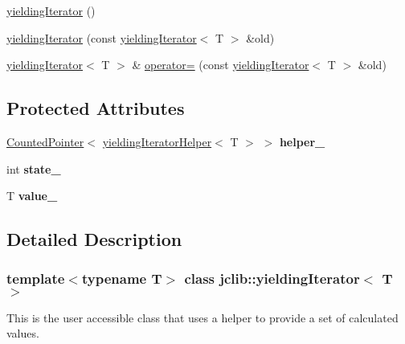 \begin{DoxyCompactItemize}
\item 
\hyperlink{classjclib_1_1yieldingIterator_a2dc7307fa736746412ad507c2acbd963}{yielding\+Iterator} ()
\item 
\hyperlink{classjclib_1_1yieldingIterator_a8aaf76517fb120bca9cae336eff64458}{yielding\+Iterator} (const \hyperlink{classjclib_1_1yieldingIterator}{yielding\+Iterator}$<$ T $>$ \&old)
\item 
\hyperlink{classjclib_1_1yieldingIterator}{yielding\+Iterator}$<$ T $>$ \& \hyperlink{classjclib_1_1yieldingIterator_adf46d4f19267c7cc52bc3b5cd814dd42}{operator=} (const \hyperlink{classjclib_1_1yieldingIterator}{yielding\+Iterator}$<$ T $>$ \&old)
\end{DoxyCompactItemize}
\subsection*{Protected Attributes}
\begin{DoxyCompactItemize}
\item 
\mbox{\label{classjclib_1_1yieldingIterator_aaac5a318f12c833c47821efa5a38db2b}} 
\hyperlink{classjclib_1_1CountedPointer}{Counted\+Pointer}$<$ \hyperlink{classjclib_1_1yieldingIteratorHelper}{yielding\+Iterator\+Helper}$<$ T $>$ $>$ {\bfseries helper\+\_\+}
\item 
\mbox{\label{classjclib_1_1yieldingIterator_a10c0d50d17d2c15ba0f2008b8a2731af}} 
int {\bfseries state\+\_\+}
\item 
\mbox{\label{classjclib_1_1yieldingIterator_a78a52215f216e47a70b62a0c463d17a5}} 
T {\bfseries value\+\_\+}
\end{DoxyCompactItemize}


\subsection{Detailed Description}
\subsubsection*{template$<$typename T$>$\newline
class jclib\+::yielding\+Iterator$<$ T $>$}

This is the user accessible class that uses a helper to provide a set of calculated values. 

